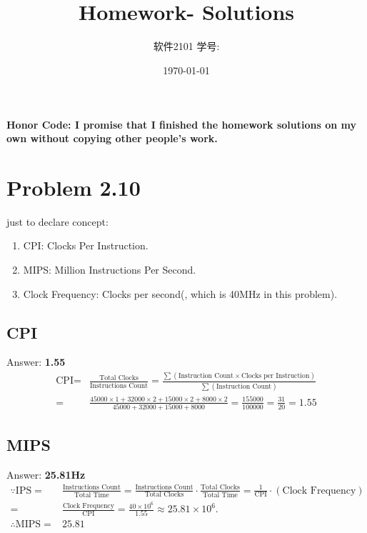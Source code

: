 \documentclass[11pt]{article}  %
\title{\vspace{-4cm}\CourseCodeName \space
        \Session \protect\\  Homework-\textbf{\Homework} Solutions}
\author{软件2101 \Name \space 学号: \SID}
\date{\today}
\begin{document}
\maketitle

\textbf{Honor Code: I promise that I finished the homework solutions on my own without copying other people's 
    work.}

\section*{Problem 2.10}

just to declare concept: 
\begin{enumerate}
    \item CPI: Clocks Per Instruction.
    \item MIPS: Million Instructions Per Second.
    \item Clock Frequency: Clocks per second(, which is 40MHz in this problem).
    \end{enumerate}

\subsection*{CPI}
    Answer: \textbf{1.55} 
    $$
    \begin{aligned}
        \text{CPI} = &\frac{\text{Total Clocks}}{\text{Instructions Count}} = 
            \frac{\sum\left(\text{Instruction Count} \times \text{Clocks per Instruction}\right)}
            {\sum\left(\text{Instruction Count}\right)}\\
        = & \frac{45000\times 1+32000 \times 2+15000\times 2+ 8000\times 2}{45000+32000+15000+8000} = 
            \frac{155000}{100000} = \frac{31}{20} = 1.55
    \end{aligned}
    $$

\subsection*{MIPS}
    Answer: \textbf{25.81Hz}
    $$
    \begin{aligned}
        \because \text{IPS} =& \frac{\text{Instructions Count}}{\text{Total Time}} = 
            \frac{\text{Instructions Count}}{\text{Total Clocks}}\cdot\frac{\text{Total Clocks}}
            {\text{Total Time}} = \frac{1}{\text{CPI}}\cdot \left(\text{Clock Frequency}\right)\\
        =&\frac{\text{Clock Frequency}}{\text{CPI}} = 
            \frac{40\times 10^6}{1.55} \approx 25.81 \times 10^6. \\
        \therefore \text{MIPS} =& 25.81
    \end{aligned}
    $$
\end{document}
